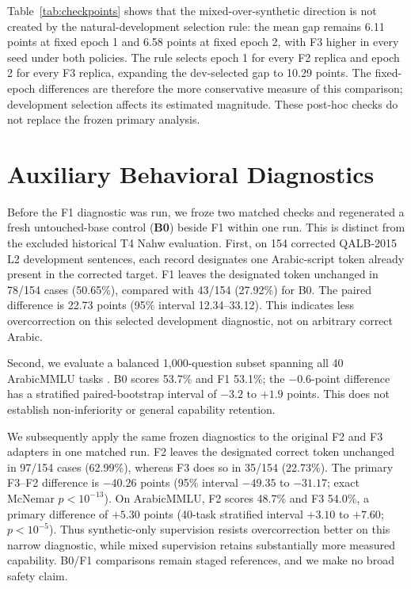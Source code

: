 \documentclass[11pt,a4paper]{article}
\begin{document}
Table~\ref{tab:checkpoints} shows that the mixed-over-synthetic direction is
not created by the natural-development selection rule: the mean gap remains
6.11 points at fixed epoch 1 and 6.58 points at fixed epoch 2, with F3 higher
in every seed under both policies.  The rule selects epoch 1 for every F2
replica and epoch 2 for every F3 replica, expanding the dev-selected gap to
10.29 points.  The fixed-epoch differences are therefore the more conservative
measure of this comparison; development selection affects its estimated
magnitude.  These post-hoc checks do not replace the frozen primary analysis.

\section{Auxiliary Behavioral Diagnostics}

Before the F1 diagnostic was run, we froze two matched checks and regenerated
a fresh untouched-base control (\textbf{B0}) beside F1 within one run.
This is distinct from the excluded historical T4 Nahw evaluation.  First, on
154 corrected QALB-2015 L2 development sentences, each record designates one
Arabic-script token already present in the corrected target.  F1 leaves the
designated token unchanged in 78/154 cases (50.65\%), compared with 43/154
(27.92\%) for B0.  The paired difference is 22.73 points (95\% interval
12.34--33.12).  This indicates less overcorrection on this selected
development diagnostic, not on arbitrary correct Arabic.

Second, we evaluate a balanced 1,000-question subset spanning all 40
ArabicMMLU tasks \citep{koto-etal-2024-arabicmmlu}.  B0 scores 53.7\% and F1
53.1\%; the $-0.6$-point difference has a stratified paired-bootstrap interval
of $-3.2$ to $+1.9$ points.  This does not establish non-inferiority or general
capability retention.

We subsequently apply the same frozen diagnostics to the original F2 and F3
adapters in one matched run.  F2 leaves the designated correct token
unchanged in 97/154 cases (62.99\%), whereas F3 does so in 35/154 (22.73\%).
The primary F3--F2 difference is $-40.26$ points (95\% interval $-49.35$ to
$-31.17$; exact McNemar $p<10^{-13}$).  On ArabicMMLU, F2 scores 48.7\% and
F3 54.0\%, a primary difference of $+5.30$ points (40-task stratified interval
$+3.10$ to $+7.60$; $p<10^{-5}$).  Thus synthetic-only supervision resists
overcorrection better on this narrow diagnostic, while mixed supervision
retains substantially more measured capability.  B0/F1 comparisons remain
staged references, and we make no broad safety claim.
\end{document}
